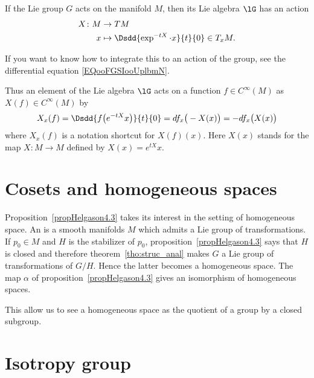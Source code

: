 \begin{definition}       \label{DEFooUYOZooWdcClz}
    If the Lie group \( G\) acts on the manifold \( M\), then its Lie algebra \( \lG\) has an action
    \begin{equation}
        \begin{aligned}
            X\colon M&\to TM \\
            x&\mapsto \Dsdd{  \exp^{-tX}\cdot x }{t}{0}\in T_xM.
        \end{aligned}
    \end{equation}
\end{definition}
If you want to know how to integrate this to an action of the group, see the differential equation \eqref{EQooFGSIooUplbmN}.

Thus an element of the Lie algebra \( \lG\) acts on a function \( f\in C^{\infty}(M)\) as \( X(f)\in C^{\infty}(M)\) by
\begin{equation}        \label{EQooQDLAooZXnWta}
    X_x(f)=\Dsdd{ f\big(  e^{-tX}x \big) }{t}{0}=df_x\big( -X(x) \big)=-df_x\big( X(x) \big)
\end{equation}
where \( X_x(f)\) is a notation shortcut for \( X(f)(x)\). Here \( X(x)\) stands for the map \( X\colon M\to M\) defined by \( X(x)= e^{tX}x\).

\section{Cosets and homogeneous spaces}

Proposition~\ref{propHelgason4.3} takes its interest in the setting of homogeneous space. An  is a smooth manifolds $M$ which admits a Lie group of transformations. If $p_{0}\in M$ and $H$ is the stabilizer of $p_{0}$, proposition~\ref{propHelgason4.3} says that $H$ is closed and therefore theorem~\ref{tho:struc_anal} makes $G$ a Lie group of transformations of $G/H$. Hence the latter becomes a homogeneous space. The map $\alpha$ of proposition~\ref{propHelgason4.3} gives an isomorphism of homogeneous spaces.

This allow us to see a homogeneous space as the quotient of a group by a closed subgroup.

\section{Isotropy group}

